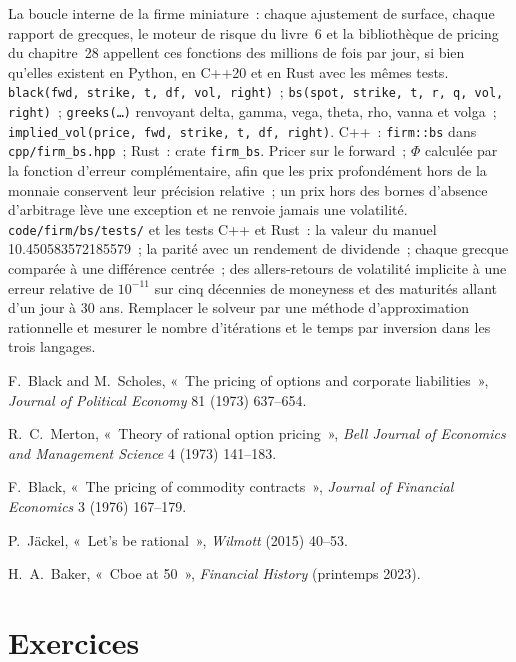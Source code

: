 \begin{build}
 La boucle interne de la firme miniature~: chaque ajustement de surface, chaque
rapport de grecques, le moteur de risque du livre~6 et la bibliothèque de pricing
du chapitre~28 appellent ces fonctions des millions de fois par jour, si bien qu'elles existent
en Python, en C++20 et en Rust avec les mêmes tests.
 \texttt{black(fwd, strike, t, df, vol, right)}~;
\texttt{bs(spot, strike, t, r, q, vol, right)}~; \texttt{greeks(\ldots)} renvoyant
delta, gamma, vega, theta, rho, vanna et volga~;
\texttt{implied\_vol(price, fwd, strike, t, df, right)}. C++~:
\texttt{firm::bs} dans \texttt{cpp/firm\_bs.hpp}~; Rust~: crate \texttt{firm\_bs}.
 Pricer sur le forward~; $\Phi$ calculée par la fonction d'erreur complémentaire, afin que les prix
profondément hors de la monnaie conservent leur précision relative~; un prix hors des
bornes d'absence d'arbitrage lève une exception et ne renvoie jamais une volatilité.
 \texttt{code/firm/bs/tests/} et les tests C++ et Rust~:
la valeur du manuel 10.450583572185579~; la parité avec un rendement de dividende~; chaque
grecque comparée à une différence centrée~; des allers-retours de volatilité implicite à une erreur relative de
$10^{-11}$ sur cinq décennies de moneyness et des maturités allant d'un jour à 30 ans.
 Remplacer le solveur par une méthode d'approximation rationnelle et
mesurer le nombre d'itérations et le temps par inversion dans les trois langages.
\end{build}

\begin{omsources}
\item F.~Black and M.~Scholes, «~The pricing of options and corporate
liabilities~», \emph{Journal of Political Economy} 81 (1973) 637--654.
\item R.~C.~Merton, «~Theory of rational option pricing~», \emph{Bell Journal of
Economics and Management Science} 4 (1973) 141--183.
\item F.~Black, «~The pricing of commodity contracts~», \emph{Journal of
Financial Economics} 3 (1976) 167--179.
\item P.~Jäckel, «~Let's be rational~», \emph{Wilmott} (2015) 40--53.
\item H.~A.~Baker, «~Cboe at 50~», \emph{Financial History} (printemps 2023).
\end{omsources}

\section{Exercices}


